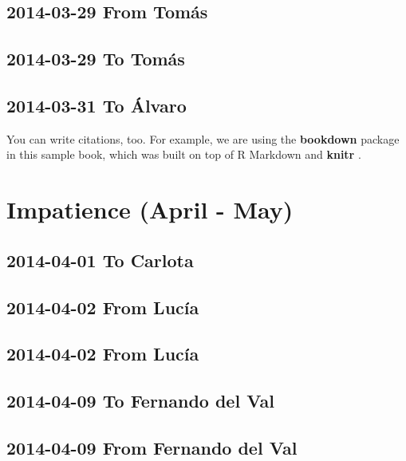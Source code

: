 \documentclass[]{book}
\begin{document}
\hypertarget{from-tomas-2}{%
\section{2014-03-29 From Tomás}\label{from-tomas-2}}

\hypertarget{to-tomas-6}{%
\section{2014-03-29 To Tomás}\label{to-tomas-6}}

\hypertarget{to-alvaro-1}{%
\section{2014-03-31 To Álvaro}\label{to-alvaro-1}}

You can write citations, too. For example, we are using the \textbf{bookdown} package \citep{R-bookdown} in this sample book, which was built on top of R Markdown and \textbf{knitr} \citep{xie2015}.

\hypertarget{impatience}{%
\chapter{Impatience (April - May)}\label{impatience}}

\hypertarget{to-carlota-2}{%
\section{2014-04-01 To Carlota}\label{to-carlota-2}}

\hypertarget{from-lucia-2}{%
\section{2014-04-02 From Lucía}\label{from-lucia-2}}

\hypertarget{from-lucia-3}{%
\section{2014-04-02 From Lucía}\label{from-lucia-3}}

\hypertarget{to-fernando-del-val-1}{%
\section{2014-04-09 To Fernando del Val}\label{to-fernando-del-val-1}}

\hypertarget{from-fernando-del-val-2}{%
\section{2014-04-09 From Fernando del Val}\label{from-fernando-del-val-2}}
\end{document}
